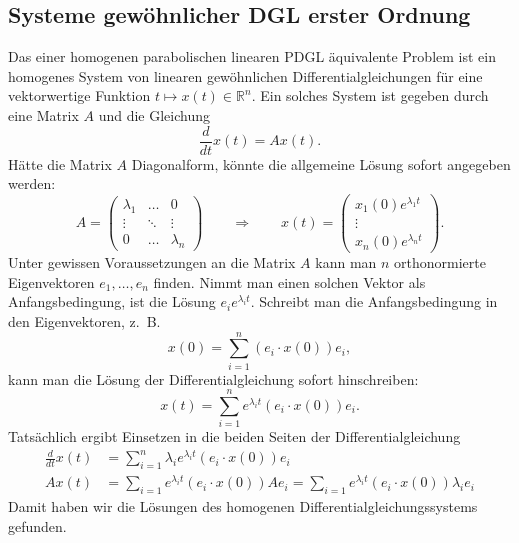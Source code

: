 \subsection{Systeme gewöhnlicher DGL erster Ordnung}
Das einer homogenen parabolischen linearen PDGL äquivalente Problem
ist ein homogenes System
von linearen gewöhnlichen Differentialgleichungen für eine vektorwertige Funktion
$t\mapsto x(t)\in\mathbb R^n$.
Ein solches System ist gegeben durch eine Matrix $A$ und die Gleichung
\[
\frac{d}{dt}x(t)=Ax(t).
\]
Hätte die Matrix $A$ Diagonalform, könnte die allgemeine Lösung 
sofort angegeben werden:
\[
A=\begin{pmatrix}
\lambda_1&\dots&0\\
\vdots&\ddots&\vdots\\
0&\dots&\lambda_n
\end{pmatrix}
\qquad\Rightarrow\qquad
x(t)=\begin{pmatrix}
x_1(0)e^{\lambda_1t}
\\
\vdots
\\
x_n(0)e^{\lambda_nt}
\end{pmatrix}.
\]
Unter gewissen Voraussetzungen an die Matrix $A$ kann man $n$
orthonormierte Eigenvektoren
$e_1,\dots,e_n$ finden. Nimmt man einen solchen Vektor als
Anfangsbedingung, ist die Lösung $e_ie^{\lambda_it}$. Schreibt man die
Anfangsbedingung in den Eigenvektoren, z.~B.
\[
x(0)=\sum_{i=1}^n(e_i \cdot x(0))e_i,
\]
kann man die Lösung der Differentialgleichung sofort hinschreiben:
\begin{equation}
x(t)=\sum_{i=1}^n
e^{\lambda_i t}
(e_i\cdot x(0))e_i
.
\label{development}
\end{equation}
Tatsächlich ergibt Einsetzen in die beiden Seiten der Differentialgleichung
\begin{align*}
\frac{d}{dt}x(t)&=\sum_{i=1}^n\lambda_ie^{\lambda_i t}(e_i\cdot x(0))e_i
\\
Ax(t)
&=\sum_{i=1}e^{\lambda_it}(e_i\cdot x(0))Ae_i
=\sum_{i=1}e^{\lambda_it}(e_i\cdot x(0))\lambda_i e_i
\end{align*}
Damit haben wir die Lösungen des homogenen Differentialgleichungssystems
gefunden.

